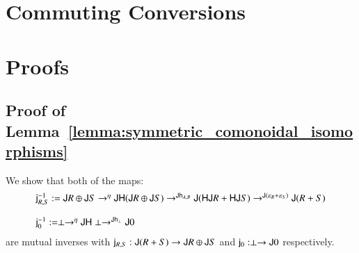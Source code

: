 \section{Commuting Conversions}
\label{sec:commuting_conversions}

%  


\section{Proofs}
\label{sec:proofs}

\subsection{Proof of Lemma~\ref{lemma:symmetric_comonoidal_isomorphisms}}
\label{subsec:proof_of_lemma:symmetric_comonoidal_isomorphisms}
We show that both of the  maps:
\[
\begin{array}{lll}
  \mathsf{j}^{-1}_{R,S} := \mathsf{J}R \oplus \mathsf{J}S \rightarrow^{\eta} \mathsf{JH}(\mathsf{J}R \oplus \mathsf{J}S) \rightarrow^{\mathsf{J}\mathsf{h}_{A,B}} \mathsf{J}(\mathsf{HJ}R + \mathsf{HJ}S) \rightarrow^{\mathsf{J}(\varepsilon_R + \varepsilon_S)} \mathsf{J}(R + S)\\
  \\
  \mathsf{j}^{-1}_{0} := \perp \rightarrow^{\eta} \mathsf{JH}\perp \rightarrow^{\mathsf{J}\mathsf{h}_{\perp}} \mathsf{J}0
\end{array}
\]
are mutual inverses with $\mathsf{j}_{R,S} : \mathsf{J}(R + S) \rightarrow \mathsf{J}R
\oplus \mathsf{J}S$ and $\mathsf{j}_{0} : \perp \rightarrow \mathsf{J}0$ respectively.

